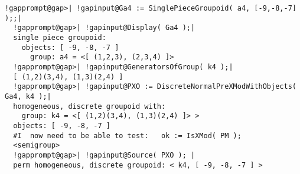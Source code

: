 \documentclass[a4paper,11pt]{report}
\begin{document}
{{\begin{Verbatim}[commandchars=!@|,fontsize=\small,frame=single,label=Example]
  !gapprompt@gap>| !gapinput@Ga4 := SinglePieceGroupoid( a4, [-9,-8,-7] );;|
  !gapprompt@gap>| !gapinput@Display( Ga4 );|
  single piece groupoid: 
    objects: [ -9, -8, -7 ]
      group: a4 = <[ (1,2,3), (2,3,4) ]>
  !gapprompt@gap>| !gapinput@GeneratorsOfGroup( k4 );|
  [ (1,2)(3,4), (1,3)(2,4) ]
  !gapprompt@gap>| !gapinput@PXO := DiscreteNormalPreXModWithObjects( Ga4, k4 );|
  homogeneous, discrete groupoid with:
    group: k4 = <[ (1,2)(3,4), (1,3)(2,4) ]> >
  objects: [ -9, -8, -7 ]
  #I  now need to be able to test:   ok := IsXMod( PM );
  <semigroup>
  !gapprompt@gap>| !gapinput@Source( PXO ); |
  perm homogeneous, discrete groupoid: < k4, [ -9, -8, -7 ] >
  
\end{Verbatim}
 }

 }

            
\end{document}
